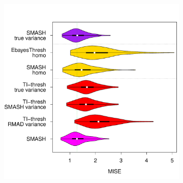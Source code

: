 \documentclass[12pt]{article}
\begin{document}
\begin{figure}
\begin{subfigure}[b]{0.3\textwidth}
        \caption{}
        \label{fig:gaus_hetero_sd_1}
    \end{subfigure}
		\hfill
    \begin{subfigure}[b]{0.65\textwidth}
        \centering
        \includegraphics[width=\textwidth]{violin_gaus_hetero_2.pdf}
        \caption{}
        \label{fig:gaus_hetero_2}
    \end{subfigure}
		\hfill
    \begin{subfigure}[b]{0.3\textwidth}
        \centering

\end{subfigure}
\end{figure}
\end{document}

